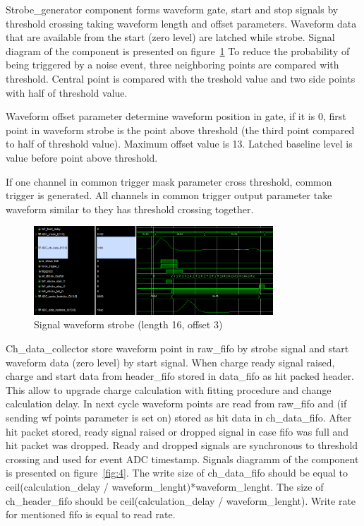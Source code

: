 \documentclass{article}
\begin{document}
Strobe\_generator component forms waveform gate, start and stop signals by threshold crossing taking waveform length and offset parameters. Waveform data that are available from the start (zero level) are latched while strobe. Signal diagram of the component is presented on figure~\ref{fig:3} To reduce the probability of being triggered by a noise event, three neighboring points are compared with threshold. Central point is compared with the treshold value and two side points with half of threshold value.

Waveform offset parameter determine waveform position in gate, if it is 0, first point in waveform strobe is  the point above threshold (the third point compared to half of threshold value). Maximum offset value is 13. Latched baseline level is value before point above threshold.

If one channel in common trigger mask parameter cross threshold, common trigger is generated. All channels in common trigger output parameter take waveform similar to they has threshold crossing together.

\begin{figure}[H]
	\centering 
	\includegraphics[width=0.8\textwidth]{wf_strobe_diag_sim.png}
	\caption{\label{fig:3} Signal waveform strobe (length 16, offset 3)}
\end{figure}


Ch\_data\_collector store waveform point in raw\_fifo by strobe signal and start waveform data (zero level) by start signal. When charge ready signal raised, charge and start data from header\_fifo stored in data\_fifo as hit packed header. This allow to upgrade charge calculation with fitting procedure and change calculation delay. In next cycle waveform points are read from raw\_fifo and (if sending wf points parameter is set on) stored as hit data in ch\_data\_fifo. After hit packet stored, ready signal raised or dropped signal in case fifo was full and hit packet was dropped. Ready and dropped signals are synchronous to threshold crossing and used for event ADC timestamp.  Signals diagramm of the component is presented on figure~\ref{fig:4}. The write size of ch\_data\_fifo should be equal to ceil(calculation\_delay / waveform\_lenght)*waveform\_lenght. The size of ch\_header\_fifo should be ceil(calculation\_delay / waveform\_lenght). Write rate for mentioned fifo is equal to read rate.
\end{document}
